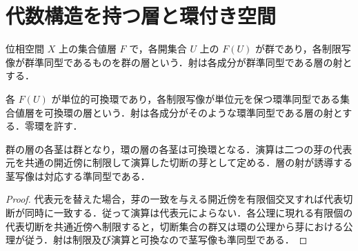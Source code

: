 \section{代数構造を持つ層と環付き空間}
\begin{defn}[群の層]
位相空間 $X$ 上の集合値層 $F$ で，各開集合 $U$ 上の $F(U)$ が群であり，各制限写像が群準同型であるものを群の層という．射は各成分が群準同型である層の射とする．
\end{defn}
\begin{defn}[環の層]
各 $F(U)$ が単位的可換環であり，各制限写像が単位元を保つ環準同型である集合値層を可換環の層という．射は各成分がそのような環準同型である層の射とする．零環を許す．
\end{defn}
\begin{prop}[群及び環の茎の代数構造]
群の層の各茎は群となり，環の層の各茎は可換環となる．演算は二つの芽の代表元を共通の開近傍に制限して演算した切断の芽として定める．層の射が誘導する茎写像は対応する準同型である．
\end{prop}
\begin{proof}
代表元を替えた場合，芽の一致を与える開近傍を有限個交叉すれば代表切断が同時に一致する．従って演算は代表元によらない．各公理に現れる有限個の代表切断を共通近傍へ制限すると，切断集合の群又は環の公理から芽における公理が従う．射は制限及び演算と可換なので茎写像も準同型である．
\end{proof}
